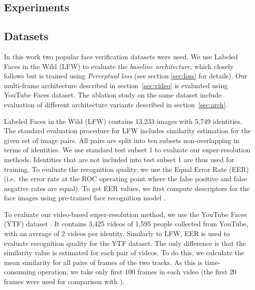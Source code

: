 \subsection{Experiments}

\label{sec:exps}
\subsection{Datasets}

In this work two popular face verification datasets were used. We use Labeled Faces in the Wild (LFW) to evaluate the \textit{baseline architecture}, which closely follows \cite{TuzelTH16} but is trained using \emph{Perceptual loss} (see section \ref{sec:loss} for details). Our multi-frame architecture described in section~\ref{sec:video} is evaluated using YouTube Faces dataset. The ablation study on the same dataset include evaluation of different architecture variants described in section~\ref{sec:arch}.

Labeled Faces in the Wild (LFW) \cite{KaramZ15} contains 13,233 images with 5,749 identities. The standard evaluation procedure for LFW includes similarity estimation for the given set of image pairs. All pairs are split into ten subsets non-overlapping in terms of identities. We use standard test subset $1$ to evaluate our super-resolution methods. Identities that are not included into test subset $1$ are thus used for training. To evaluate the recognition quality, we use the Equal Error Rate (EER) (i.e.\ the error rate at the ROC operating point where the false positive and false negative rates are equal). To get EER values, we first  compute descriptors for the face images using pre-trained face recognition model \cite{ParkhiVZ15}.


To evaluate our video-based super-resolution method, we use the YouTube Faces (YTF) dataset \cite{WolfHM11}. It contains 3,425 videos of 1,595
people collected from YouTube, with an average of 2 videos per identity. Similarly to LFW, EER is used to evaluate recognition quality for the YTF dataset. The only difference is that the similarity value is estimated for each pair of videos. To do this, we calculate the mean similarity for all pairs of frames of the two tracks. As this is time-consuming operation, we take only first $100$ frames in each video (the first $20$ frames were used for comparison with \cite{ZhuLLT16}). %

